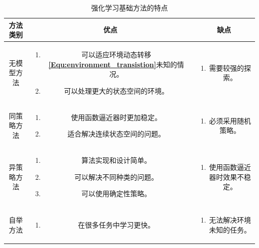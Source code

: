 \begin{table}[!tp]
    \caption{强化学习基础方法的特点}
    
	\centering
	\begin{tabular}{c||c ||c }
    \hline
    方法类别&优点 & 缺点\\
    \hline
    无模型方法&\parbox{.4\linewidth}{\begin{enumerate}
      \item 可以适应环境动态转移\textbf{\eqref{Equ:environment_transistion}}未知的情况。
      \item 可以处理更大的状态空间的环境。
    \end{enumerate}} & \parbox{.3\linewidth}{\begin{enumerate}
      \item 需要较强的探索。
    \end{enumerate}}\\
    
    \hline

    同策略方法&\parbox{.4\linewidth}{\begin{enumerate}
      \item 使用函数逼近器时更加稳定。
      \item 适合解决连续状态空间的问题。
    \end{enumerate}} & \parbox{.3\linewidth}{\begin{enumerate}
      \item 必须采用随机策略。
     
    \end{enumerate}}\\
    
    \hline
    
    异策略方法&\parbox{.4\linewidth}{\begin{enumerate}
      \item 算法实现和设计简单。
      \item 可以解决不同种类的问题。
      \item 可以使用确定性策略。
    \end{enumerate}} & \parbox{.3\linewidth}{\begin{enumerate}
      \item 使用函数逼近器时效果不稳定。
    \end{enumerate}}\\
    
    \hline
    自举方法&\parbox{.4\linewidth}{\begin{enumerate}
      \item 在很多任务中学习更快。
    \end{enumerate}} & \parbox{.3\linewidth}{\begin{enumerate}
      \item 无法解决环境未知的任务。
    \end{enumerate}}\\

    \hline
    \end{tabular}
    \label{Table: adv and disadv on RL method}
    
\end{table}


